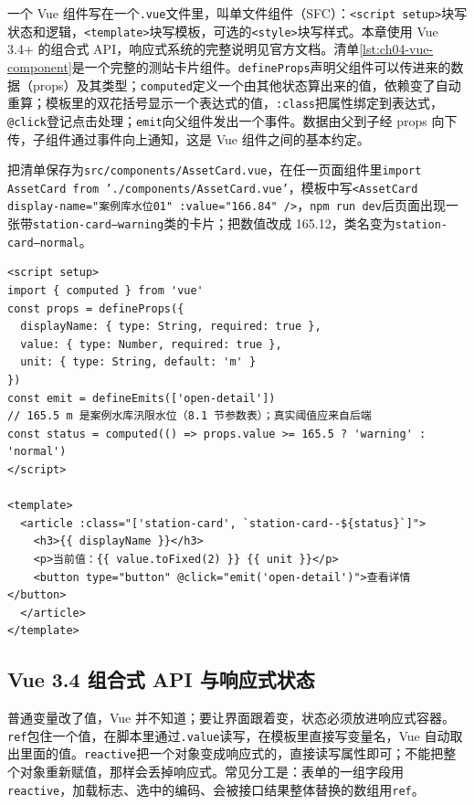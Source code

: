 一个 Vue 组件写在一个\texttt{.vue}文件里，叫单文件组件（SFC）：\texttt{<script setup>}块写状态和逻辑，\texttt{<template>}块写模板，可选的\texttt{<style>}块写样式。本章使用 Vue 3.4+ 的组合式 API，响应式系统的完整说明见官方文档\cite{vueDocs}。清单\ref{lst:ch04-vue-component}是一个完整的测站卡片组件。\texttt{defineProps}声明父组件可以传进来的数据（props）及其类型；\texttt{computed}定义一个由其他状态算出来的值，依赖变了自动重算；模板里的双花括号显示一个表达式的值，\texttt{:class}把属性绑定到表达式，\texttt{@click}登记点击处理；\texttt{emit}向父组件发出一个事件。数据由父到子经 props 向下传，子组件通过事件向上通知，这是 Vue 组件之间的基本约定。

把清单保存为\texttt{src/components/AssetCard.vue}，在任一页面组件里\texttt{import AssetCard from './components/AssetCard.vue'}，模板中写\texttt{<AssetCard display-name="案例库水位01" :value="166.84" />}，\texttt{npm run dev}后页面出现一张带\texttt{station-card--warning}类的卡片；把数值改成 165.12，类名变为\texttt{station-card--normal}。

\begin{lstlisting}[label={lst:ch04-vue-component},language=Vue,caption={测站卡片组合式组件}]
<script setup>
import { computed } from 'vue'
const props = defineProps({
  displayName: { type: String, required: true },
  value: { type: Number, required: true },
  unit: { type: String, default: 'm' }
})
const emit = defineEmits(['open-detail'])
// 165.5 m 是案例水库汛限水位（8.1 节参数表）；真实阈值应来自后端
const status = computed(() => props.value >= 165.5 ? 'warning' : 'normal')
</script>

<template>
  <article :class="['station-card', `station-card--${status}`]">
    <h3>{{ displayName }}</h3>
    <p>当前值：{{ value.toFixed(2) }} {{ unit }}</p>
    <button type="button" @click="emit('open-detail')">查看详情</button>
  </article>
</template>
\end{lstlisting}

\subsection{Vue 3.4 组合式 API 与响应式状态}

普通变量改了值，Vue 并不知道；要让界面跟着变，状态必须放进响应式容器。\texttt{ref}包住一个值，在脚本里通过\texttt{.value}读写，在模板里直接写变量名，Vue 自动取出里面的值。\texttt{reactive}把一个对象变成响应式的，直接读写属性即可；不能把整个对象重新赋值，那样会丢掉响应式。常见分工是：表单的一组字段用\texttt{reactive}，加载标志、选中的编码、会被接口结果整体替换的数组用\texttt{ref}。

